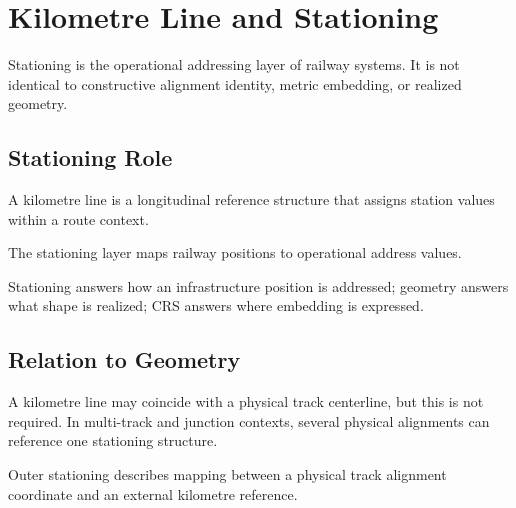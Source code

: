 
\chapter{Kilometre Line and Stationing}

\label{chap:km-line-and-stationing}


Stationing is the operational addressing layer of railway systems. It is
not identical to constructive alignment identity, metric embedding, or
realized geometry.

\section{Stationing Role}

\begin{definition}
A kilometre line is a longitudinal reference structure that assigns
station values within a route context.
\end{definition}

\begin{definition}
The stationing layer maps railway positions to operational address
values.
\end{definition}

Stationing answers how an infrastructure position is addressed;
geometry answers what shape is realized; CRS answers where embedding is
expressed.

\section{Relation to Geometry}

A kilometre line may coincide with a physical track centerline, but this
is not required. In multi-track and junction contexts, several physical
alignments can reference one stationing structure.

\begin{definition}
Outer stationing describes mapping between a physical track alignment
coordinate and an external kilometre reference.
\end{definition}

